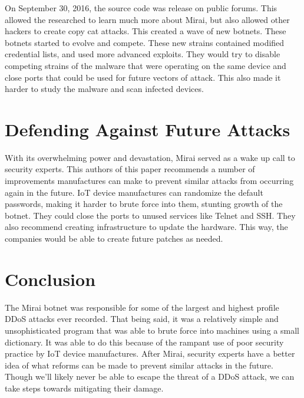 \documentclass[conference]{IEEEtran}
\begin{document}
On September 30, 2016, the source code was release on public forums. This allowed the researched to learn much more about Mirai, but also allowed other hackers to create copy cat attacks. This created a wave of new botnets. These botnets started to evolve and compete. These new strains contained modified credential lists, and used more advanced exploits. They would try to disable competing strains of the malware that were operating on the same device and close ports that could be used for future vectors of attack. This also made it harder to study the malware and scan infected devices. 

\section{Defending Against Future Attacks}

With its overwhelming power and devastation, Mirai served as a wake up call to security experts. This authors of this paper recommends a number of improvements manufactures can make to prevent similar attacks from occurring again in the future. IoT device manufactures can randomize the default passwords, making it harder to brute force into them, stunting growth of the botnet. They could close the ports to unused services like Telnet and SSH. They also recommend creating infrastructure to update the hardware. This way, the companies would be able to create future patches as needed.

\section{Conclusion}

The Mirai botnet was responsible for some of the largest and highest profile DDoS attacks ever recorded. That being said, it was a relatively simple and unsophisticated program that was able to brute force into machines using a small dictionary. It was able to do this because of the rampant use of poor security practice by IoT device manufactures. After Mirai, security experts have a better idea of what reforms can be made to prevent similar attacks in the future. Though we'll likely never be able to escape the threat of a DDoS attack, we can take steps towards mitigating their damage.



\end{document}
